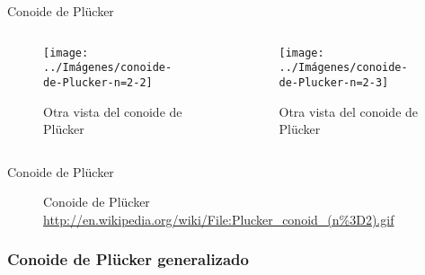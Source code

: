 \documentclass[10pt]{beamer}
\begin{document}
	\begin{frame}{Conoide de Plücker}
		\begin{columns}[b] %
			\begin{column}{.50\textwidth}
				\begin{figure}
					\centering
					\texttt{[image: ../Imágenes/conoide-de-Plucker-n=2-2]}
					\caption{Otra vista del conoide de Plücker}
					\label{fig:conoide-de-Plücker-2}
				\end{figure}
			\end{column}%
			\hfill%
			\begin{column}{.50\textwidth}
				\begin{figure}
					\centering
					\texttt{[image: ../Imágenes/conoide-de-Plucker-n=2-3]}
					\caption{Otra vista del conoide de Plücker}
					\label{fig:conoide-de-Plucker-3}
				\end{figure}
			\end{column}%
		\end{columns}
	\end{frame}
	
	\begin{frame}{Conoide de Plücker}
	\begin{figure}
		\centering
		\caption{Conoide de Plücker \url{http://en.wikipedia.org/wiki/File:Plucker_conoid_(n\%3D2).gif}}
		\label{fig:conoide-de-Plücker-gif}
	\end{figure}
	\end{frame}
	
	\subsubsection{Conoide de Plücker generalizado}
	
\end{document}

